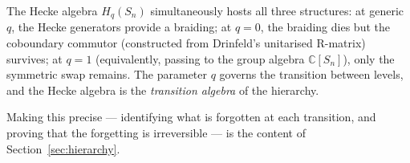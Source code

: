 \noindent
The Hecke algebra $H_q(S_n)$ simultaneously hosts all three
structures: at generic~$q$, the Hecke generators provide a braiding;
at $q = 0$, the braiding dies but the coboundary commutor (constructed
from Drinfeld's unitarised R-matrix) survives; at $q = 1$
(equivalently, passing to the group algebra $\mathbb{C}[S_n]$), only
the symmetric swap remains.  The parameter $q$ governs the transition
between levels, and the Hecke algebra is the \emph{transition algebra}
of the hierarchy.

Making this precise --- identifying what is forgotten at each
transition, and proving that the forgetting is irreversible --- is the
content of Section~\ref{sec:hierarchy}.
